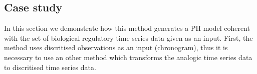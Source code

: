 
\subsection{Case study}
\label{case_study}

In this section we demonstrate how this method generates a PH model coherent with the set of biological regulatory time series data given as an input. 
First, the method uses discritised observations as an input (\ie chronogram), thus it is necessary to use an other method which transforms the analogic time series data to discritised time series data.



